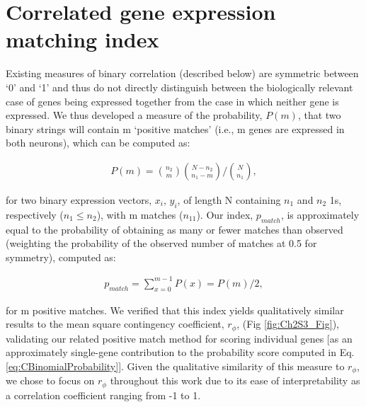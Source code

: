 \section{Correlated gene expression matching index}
\label{app:AppendixCh2_3}

Existing measures of binary correlation (described below) are symmetric between ‘0’ and ‘1’ and thus do not directly distinguish between the biologically relevant case of genes being expressed together from the case in which neither gene is expressed. We thus developed a measure of the probability, $P(m)$, that two binary strings will contain m ‘positive matches’ (i.e., m genes are expressed in both neurons), which can be computed as:


\begin{eqnarray}
	\label{eq:S3}
     P(m) = \binom{n_{2}}{m}\binom{N-n_{2}}{n_{1}-m}/\binom{N}{n_{1}},
\end{eqnarray}

for two binary expression vectors, $x_{i}$, $y_{i}$, of length N containing $n_{1}$ and $n_{2}$ 1s, respectively ($n_{1} \leq n_{2}$), with m matches ($n_{11}$). Our index, $p_{match}$, is approximately equal to the probability of obtaining as many or fewer matches than observed (weighting the probability of the observed number of matches at 0.5 for symmetry), computed as:

\begin{eqnarray}
	\label{eq:S4}
     p_{match} = \sum_{x=0}^{m-1}P(x)=P(m)/2,
\end{eqnarray}

for m positive matches.
	We verified that this index yields qualitatively similar results to the mean square contingency coefficient, $r_\phi$, (Fig \ref{fig:Ch2S3_Fig}), validating our related positive match method for scoring individual genes [as an approximately single-gene contribution to the probability score computed in Eq. \ref{eq:CBinomialProbability}]. 
Given the qualitative similarity of this measure to $r_\phi$, we chose to focus on $r_\phi$ throughout this work due to its ease of interpretability as a correlation coefficient ranging from -1 to 1.

